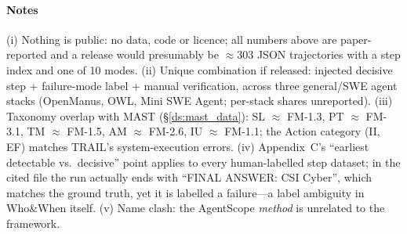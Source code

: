 \paragraph{Notes} (i) Nothing is public: no data, code or licence; all numbers above are paper-reported and a release would presumably be $\approx$303 JSON trajectories with a step index and one of 10 modes. (ii) Unique combination if released: injected decisive step + failure-mode label + manual verification, across three general/SWE agent stacks (OpenManus, OWL, Mini SWE Agent; per-stack shares unreported). (iii) Taxonomy overlap with MAST (\S\ref{ds:mast_data}): SL $\approx$ FM-1.3, PT $\approx$ FM-3.1, TM $\approx$ FM-1.5, AM $\approx$ FM-2.6, IU $\approx$ FM-1.1; the Action category (II, EF) matches TRAIL's system-execution errors. (iv) Appendix~C's ``earliest detectable vs.\ decisive'' point applies to every human-labelled step dataset; in the cited file the run actually ends with ``FINAL ANSWER: CSI Cyber'', which matches the ground truth, yet it is labelled a failure---a label ambiguity in Who\&When itself. (v) Name clash: the AgentScope \emph{method} is unrelated to the  framework.
